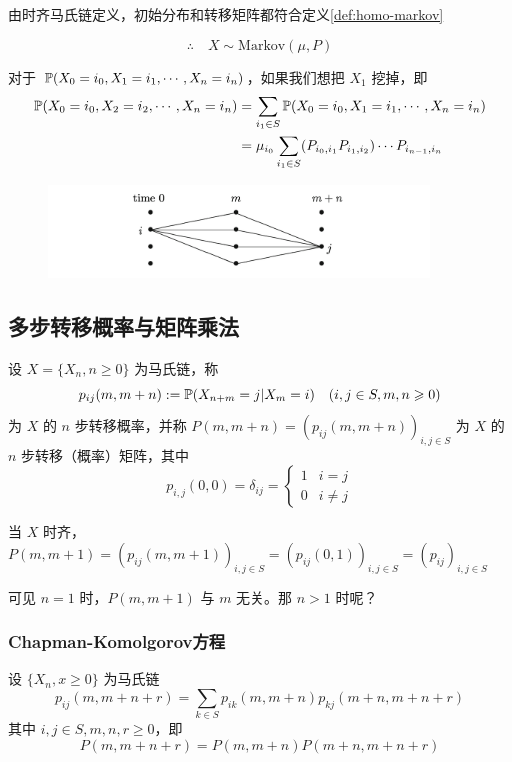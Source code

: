 由时齐马氏链定义，初始分布和转移矩阵都符合定义\ref{def:homo-markov}

\[
\therefore \quad X\sim \text{Markov}(\mu,P)
\]

对于 $\mathbb{P}(X_0=i_0,X_1=i_1,\cdots,X_{n}=i_{n})$，如果我们想把 $X_1$ 挖掉，即
\[
\begin{aligned}
    \mathbb{P}(X_0=i_0,X_2=i_2,\cdots,X_{n}=i_{n})&=\sum_{i_1\in S}\mathbb{P}(X_0=i_0,X_1=i_1,\cdots,X_{n}=i_{n})\\
    &=\mu_{i_0}\sum_{i_1\in S}(P_{i_0,i_1}P_{i_1,i_2})\cdots P_{i_{n-1},i_n}
\end{aligned}
\]

\begin{figure}[H]
    \centering
    \includegraphics[width=0.9\textwidth]{figures/split_steps.png}
\end{figure}

\subsection{多步转移概率与矩阵乘法}

\begin{definition}
    设 $X=\{X_n,n\geq 0\}$ 为马氏链，称
    \[
    p_{ij}(m,m+n):=\mathbb{P}(X_{n+m}=j|X_m=i)\quad (i,j\in S, m,n\geqslant 0)
    \]
    为 $X$ 的 $n$ 步转移概率，并称 $P(m,m+n)=(p_{ij}(m,m+n))_{i,j\in S}$ 为 $X$ 的 $n$ 步转移（概率）矩阵，其中
    \[
    p_{i,j}(0,0)=\delta_{ij}=\begin{cases}
        1 & i=j\\
        0 & i\neq j
    \end{cases}
    \]
\end{definition}

当 $X$ 时齐，$P(m,m+1)=(p_{ij}(m,m+1))_{i,j\in S}=(p_{ij}(0,1))_{i,j\in S}=(p_{ij})_{i,j\in S}$

可见 $n=1$ 时，$P(m,m+1)$ 与 $m$ 无关。那 $n>1$ 时呢？

\subsubsection{Chapman-Komolgorov方程}

\begin{theorem}[C-K方程]
    设 $\{X_n,x\geq 0\}$ 为马氏链
    \[
    p_{ij}(m,m+n+r)=\sum_{k\in S}p_{ik}(m,m+n)p_{kj}(m+n,m+n+r)
    \]
    其中 $i,j\in S,m,n,r\geq 0$，即
    \[
    P(m,m+n+r)=P(m,m+n)P(m+n,m+n+r)
    \]
\end{theorem}

